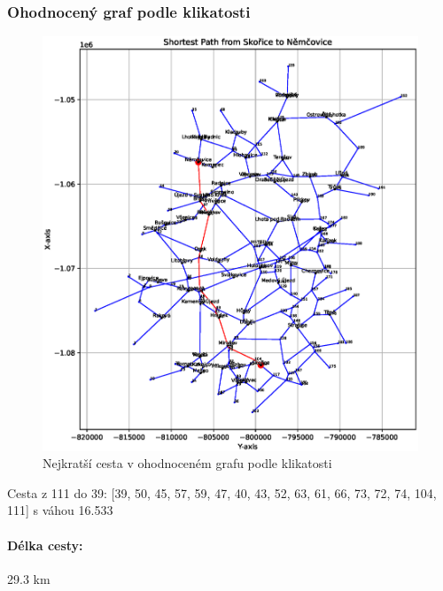 \subsubsection*{Ohodnocený graf podle klikatosti}
\begin{figure}[H]
    \centering
    \includegraphics[width=\textwidth]{images/Figure_1_curvature.eps}
    \caption{Nejkratší cesta v ohodnoceném grafu podle klikatosti}
\end{figure}

Cesta z 111 do 39: [39, 50, 45, 57, 59, 47, 40, 43, 52, 63, 61, 66, 73, 72, 74, 104, 111] s váhou 16.533
\paragraph{Délka cesty:} 29.3 km

